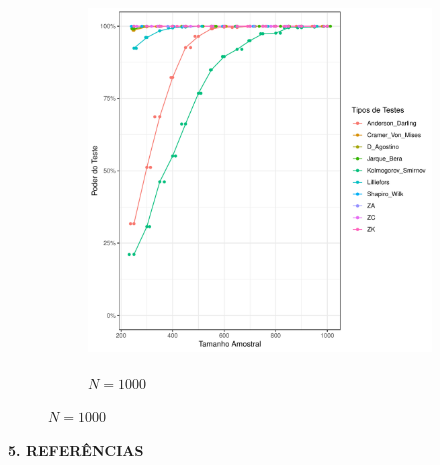 \documentclass[final]{beamer}
\begin{document}
\begin{frame}[t]
\begin{columns}[t,totalwidth=0.6\paperwidth]
\begin{column}{0.45\textwidth}
\begin{figure}[H]
\begin{subfigure}[b]{0.32\textwidth}
        \includegraphics[height=10cm,keepaspectratio]{Distribuição_Beta/Poder_Teste/poder_teste_beta_1000.pdf}
        \caption{\(N = 1000\)}
    \end{subfigure}
\end{figure}


    





    \vspace{1.3cm}
{\large\bfseries 5. REFERÊNCIAS}\par

    \vspace{1.3cm}

    
  
    \normalsize
  \end{column}
\end{columns}

\end{frame}
\end{document}
